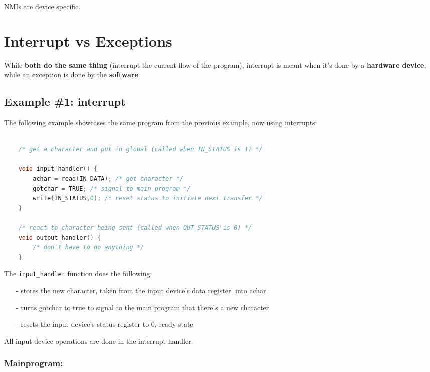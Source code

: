 NMIs are device specific.



\section{Interrupt vs Exceptions}

While \textbf{both do the same thing} (interrupt the current flow of the program), interrupt is meant when it's done
by a \textbf{hardware device}, while an exception is done by the \textbf{software}.

\subsection{Example \#1: interrupt}


The following example showcases the same program from the previous example, now using interrupts:

\begin{lstlisting}[language=c]

    /* get a character and put in global (called when IN_STATUS is 1) */
     
    void input_handler() {
        achar = read(IN_DATA); /* get character */
        gotchar = TRUE; /* signal to main program */
        write(IN_STATUS,0); /* reset status to initiate next transfer */
    }
    
    /* react to character being sent (called when OUT_STATUS is 0) */
    void output_handler() {
        /* don't have to do anything */
    }
\end{lstlisting}

The \verb|input_handler| function does the following:

\begin{itemize}
    \item[-] stores the new character, taken from the input device's data register, into achar
    \item[-] turns gotchar to true to signal to the main program that there's a new character
    \item[-] resets the input device's status register to 0, ready state
\end{itemize}


All input device operations are done in the interrupt handler.


\subsubsection{Mainprogram:}

